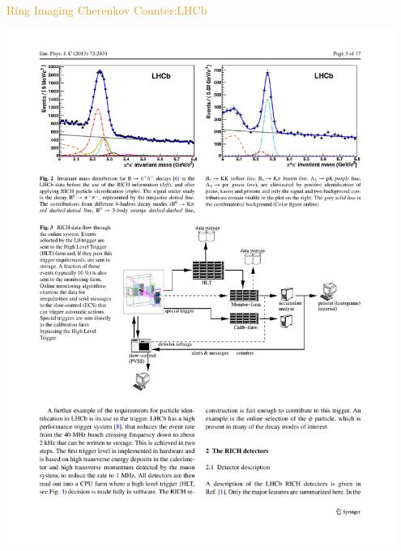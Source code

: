 \documentclass[11pt]{beamer} %
\renewcommand{\(}{\begin{columns}}
\renewcommand{\)}{\end{columns}}
\newcommand{\<}[1]{\begin{column}{#1}}
\renewcommand{\>}{\end{column}}
\begin{document}
\begin{frame}{\textcolor{Goldenrod}{Ring Imaging Cherenkov Counter:LHCb}}
  \begin{center}
    \includegraphics[width=0.95\textwidth,height=0.6\textheight]{./Images/RICH_counters_05}
  \end{center}
\end{frame}  
\end{document}
